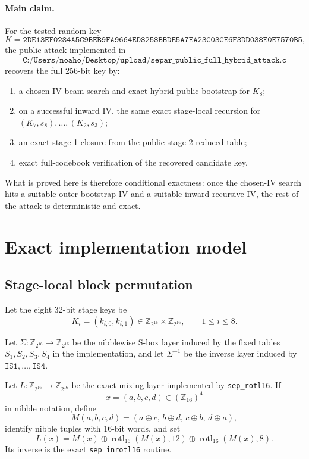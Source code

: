 \documentclass[11pt]{article}
\newcommand{\Z}[1]{\mathbb{Z}_{#1}}
\newcommand{\rot}{\operatorname{rotl}_{16}}
\begin{document}
\paragraph{Main claim.}
For the tested random key
\[
K=
\texttt{2DE13EF0284A5C9BEB9FA9664ED8258BBDE5A7EA23C03CE6F3DD038E0E7570B5},
\]
the public attack implemented in
\[
\texttt{C:/Users/noaho/Desktop/upload/separ\_public\_full\_hybrid\_attack.c}
\]
recovers the full 256-bit key by:
\begin{enumerate}[label=\arabic*.,leftmargin=1.5em]
\item a chosen-IV beam search and exact hybrid public bootstrap for $K_8$;
\item on a successful inward IV, the same exact stage-local recursion for $(K_7,s_8),\dots,(K_2,s_3)$;
\item an exact stage-1 closure from the public stage-2 reduced table;
\item exact full-codebook verification of the recovered candidate key.
\end{enumerate}

What is proved here is therefore conditional exactness: once the chosen-IV search hits a suitable outer bootstrap IV and a suitable inward recursive IV, the rest of the attack is deterministic and exact.

\section{Exact implementation model}
\subsection{Stage-local block permutation}
Let the eight 32-bit stage keys be
\[
K_i=(k_{i,0},k_{i,1})\in \Z{2^{16}}\times \Z{2^{16}},
\qquad 1\le i\le 8.
\]

Let $\Sigma:\Z{2^{16}}\to\Z{2^{16}}$ be the nibblewise S-box layer induced by the fixed tables $S_1,S_2,S_3,S_4$ in the implementation, and let $\Sigma^{-1}$ be the inverse layer induced by $\texttt{IS1},\dots,\texttt{IS4}$.

Let $L:\Z{2^{16}}\to\Z{2^{16}}$ be the exact mixing layer implemented by \texttt{sep\_rotl16}. If
\[
x=(a,b,c,d)\in (\Z{16})^4
\]
in nibble notation, define
\[
M(a,b,c,d)=(a\oplus c,\, b\oplus d,\, c\oplus b,\, d\oplus a),
\]
identify nibble tuples with 16-bit words, and set
\[
L(x)=M(x)\oplus \rot(M(x),12)\oplus \rot(M(x),8).
\]
Its inverse is the exact \texttt{sep\_inrotl16} routine.
\end{document}

